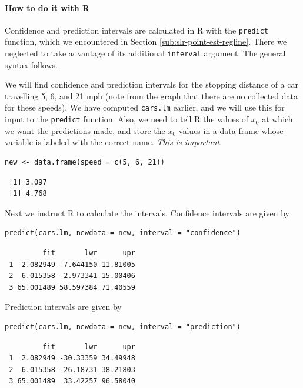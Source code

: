 \documentclass[captions=tableheading]{scrbook}
\begin{document}
\paragraph*{How to do it with \textsf{R}}

Confidence and prediction intervals are calculated in \textsf{R} with the \texttt{predict} function, which we encountered in Section \ref{sub:slr-point-est-regline}. There we neglected to take advantage of its additional \texttt{interval} argument. The general syntax follows. 

\begin{example}
We will find confidence and prediction intervals for the stopping distance of a car travelling 5, 6, and 21 mph (note from the graph that there are no collected data for these speeds). We have computed \texttt{cars.lm} earlier, and we will use this for input to the \texttt{predict} function. Also, we need to tell \textsf{R} the values of \(x_{0}\) at which we want the predictions made, and store the \(x_{0}\) values in a data frame whose variable is labeled with the correct name. \emph{This is important}. 


\begin{verbatim}
new <- data.frame(speed = c(5, 6, 21))
\end{verbatim}

\begin{verbatim}
 [1] 3.097
 [1] 4.768
\end{verbatim}

Next we instruct \textsf{R} to calculate the intervals. Confidence intervals are given by 


\begin{verbatim}
predict(cars.lm, newdata = new, interval = "confidence")
\end{verbatim}

\begin{verbatim}
         fit       lwr      upr
 1  2.082949 -7.644150 11.81005
 2  6.015358 -2.973341 15.00406
 3 65.001489 58.597384 71.40559
\end{verbatim}



Prediction intervals are given by


\begin{verbatim}
predict(cars.lm, newdata = new, interval = "prediction")
\end{verbatim}

\begin{verbatim}
         fit       lwr      upr
 1  2.082949 -30.33359 34.49948
 2  6.015358 -26.18731 38.21803
 3 65.001489  33.42257 96.58040
\end{verbatim}



\end{example}
\end{document}
